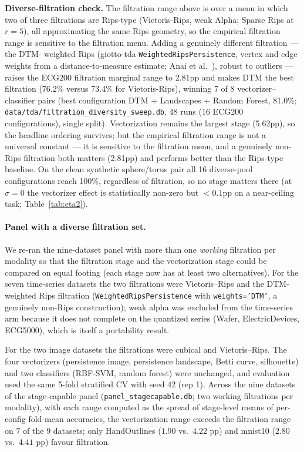 \documentclass[12pt, a4paper]{report}
\theoremstyle{definition}
\theoremstyle{plain}
\theoremstyle{remark}
\begin{document}
\textbf{Diverse-filtration check.} The filtration range above is over a
menu in which two of three filtrations are Rips-type (Vietoris-Rips,
weak Alpha; Sparse Rips at $r{=}5$), all approximating the same Rips
geometry, so the empirical filtration range is sensitive to the filtration menu. Adding a genuinely different filtration --- the DTM-
weighted Rips (giotto-tda \texttt{WeightedRipsPersistence}, vertex and
edge weights from a distance-to-measure estimate; Anai et al.~\cite{anai2019}), robust
to outliers --- raises the ECG200 filtration marginal range to 2.81pp
and makes DTM the best filtration (76.2\% versus 73.4\% for
Vietoris-Rips), winning 7 of 8 vectorizer--classifier pairs (best
configuration DTM + Landscapes + Random Forest, 81.0\%; \texttt{data/tda/filtration\_diversity\_sweep.db}, 48 runs (16 ECG200
configurations), single split). Vectorization remains the largest stage (5.62pp), so
the headline ordering survives; but the empirical filtration range is
not a universal constant --- it is sensitive to the filtration menu,
and a genuinely non-Rips filtration both matters (2.81pp) and performs
better than the Rips-type baseline. On the clean synthetic
sphere/torus pair all 16 diverse-pool configurations reach 100\%,
regardless of filtration, so no stage matters there (at $\sigma{=}0$
the vectorizer effect is statistically non-zero but $<0.1$pp on a
near-ceiling task; Table~\ref{tab:eta2}).

\paragraph{Panel with a diverse filtration set.} We re-ran the
nine-dataset panel with more than one \emph{working} filtration per
modality so that the filtration stage and the vectorization stage could
be compared on equal footing (each stage now has at least two
alternatives). For the seven time-series datasets the two filtrations
were Vietoris--Rips and the DTM-weighted Rips filtration
(\texttt{WeightedRipsPersistence} with \texttt{weights='DTM'}, a
genuinely non-Rips construction); weak alpha was excluded from the
time-series arm because it does not complete on the quantized series
(Wafer, ElectricDevices, ECG5000), which is itself a portability result.

For the two image datasets the filtrations were cubical and
Vietoris--Rips. The four vectorizers (persistence image, persistence
landscape, Betti curve, silhouette) and two classifiers (RBF-SVM,
random forest) were unchanged, and evaluation used the same 5-fold
stratified CV with seed 42 (rep 1). Across the nine datasets of the stage-capable panel
(\texttt{panel\_stagecapable.db}; two working filtrations per
modality), with each range computed as the spread of stage-level
means of per-config fold-mean accuracies, the vectorization range
exceeds the filtration range on $7$ of the $9$ datasets; only
HandOutlines ($1.90$ vs.\ $4.22$ pp) and mnist10 ($2.80$ vs.\
$4.41$ pp) favour filtration.
\end{document}
